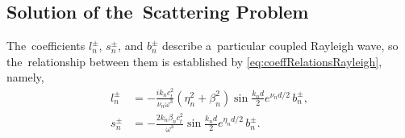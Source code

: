 \subsection{Solution of the~Scattering Problem}

The~coefficients $l_n^{\pm}$, $s_n^{\pm}$, and $b_n^{\pm}$ describe a~particular coupled Rayleigh wave, so the~relationship between them is established by \cref{eq:coeffRelationsRayleigh}, namely,
\begin{align}
{l_n^{\pm}}&=-\frac{i k_n c_t^2}{\nu_n\omega^3}(\eta_n^2+\beta_n^2)\sin\frac{k_nd}{2}e^{\nu_n\!d/2}\,{b_n^{\pm},} \label{eq:lbRayleigh} \\
{s_n^{\pm}}&=-\frac{2 k_n\beta_n c_t^2}{\omega^3}\sin\frac{k_nd}{2}e^{\eta_n\!d/2}\,{b_n^{\pm}}. \label{eq:sbRayleigh}
\end{align}

